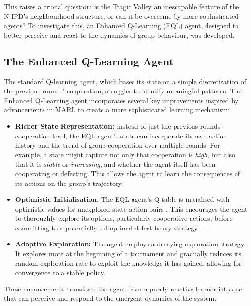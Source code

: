 \documentclass[]{llncs} %
\begin{document}
This raises a crucial question: is the Tragic Valley an inescapable
feature of the N-IPD's neighbourhood structure, or can it be overcome
by more sophisticated agents? To investigate this, an
Enhanced Q-Learning (EQL) agent, designed to better perceive and
react to the dynamics of group behaviour, was developed.

\subsection{The Enhanced Q-Learning Agent}

The standard Q-learning agent, which bases its state on a simple
discretization of the previous rounds' cooperation, struggles to
identify meaningful patterns. The Enhanced Q-Learning agent
incorporates several key improvements inspired by advancements in MARL
to create a more sophisticated learning mechanism:

\begin{itemize}
    \item \textbf{Richer State Representation:} Instead of just the
      previous rounds' cooperation level, the EQL agent's state can
      incorporate its own action history and the trend of group
      cooperation over multiple rounds. For example, a state might
      capture not only that cooperation is {\it high}, but also that it is
      {\it stable} or {\it increasing}, and whether the agent itself has been
      cooperating or defecting. This allows the agent to learn the
      consequences of its actions on the group's trajectory.
      
    \item \textbf{Optimistic Initialisation:} The EQL agent's Q-table
      is initialised with optimistic values for unexplored
      state-action pairs \cite{SuttonBarto1998}. This encourages the
      agent to thoroughly explore its options, particularly
      cooperative actions, before committing to a potentially
      suboptimal defect-heavy strategy.

    \item \textbf{Adaptive Exploration:} The agent employs a decaying
      exploration strategy. It explores more at the beginning of a
      tournament and gradually reduces its random exploration rate to
      exploit the knowledge it has gained, allowing for convergence to
      a stable policy.
\end{itemize}

These enhancements transform the agent from a purely reactive learner
into one that can perceive and respond to the emergent dynamics of the
system.
\end{document}
